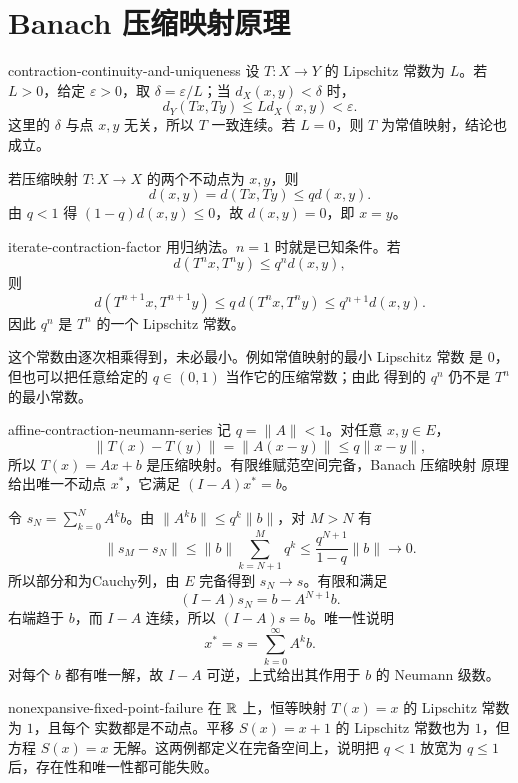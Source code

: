 \chapter{Banach 压缩映射原理}
\label{chap:banach-contraction-solutions}

\begin{solution}{contraction-continuity-and-uniqueness}
设 \(T:X\to Y\) 的 Lipschitz 常数为 \(L\)。若 \(L>0\)，给定
\(\varepsilon>0\)，取 \(\delta=\varepsilon/L\)；当
\(d_X(x,y)<\delta\) 时，
\[
 d_Y(Tx,Ty)\le Ld_X(x,y)<\varepsilon.
\]
这里的 \(\delta\) 与点 \(x,y\) 无关，所以 \(T\) 一致连续。若
\(L=0\)，则 \(T\) 为常值映射，结论也成立。

若压缩映射 \(T:X\to X\) 的两个不动点为 \(x,y\)，则
\[
 d(x,y)=d(Tx,Ty)\le qd(x,y).
\]
由 \(q<1\) 得 \((1-q)d(x,y)\le0\)，故 \(d(x,y)=0\)，即 \(x=y\)。
\end{solution}

\begin{solution}{iterate-contraction-factor}
用归纳法。\(n=1\) 时就是已知条件。若
\[
 d(T^nx,T^ny)\le q^n d(x,y),
\]
则
\[
 d(T^{n+1}x,T^{n+1}y)
 \le q\,d(T^nx,T^ny)
 \le q^{n+1}d(x,y).
\]
因此 \(q^n\) 是 \(T^n\) 的一个 Lipschitz 常数。

这个常数由逐次相乘得到，未必最小。例如常值映射的最小 Lipschitz 常数
是 \(0\)，但也可以把任意给定的 \(q\in(0,1)\) 当作它的压缩常数；由此
得到的 \(q^n\) 仍不是 \(T^n\) 的最小常数。
\end{solution}

\begin{solution}{affine-contraction-neumann-series}
记 \(q=\|A\|<1\)。对任意 \(x,y\in E\)，
\[
 \|T(x)-T(y)\|=\|A(x-y)\|\le q\|x-y\|,
\]
所以 \(T(x)=Ax+b\) 是压缩映射。有限维赋范空间完备，Banach 压缩映射
原理给出唯一不动点 \(x^\ast\)，它满足
\((I-A)x^\ast=b\)。

令 \(s_N=\sum_{k=0}^{N}A^kb\)。由
\(\|A^kb\|\le q^k\|b\|\)，对 \(M>N\) 有
\[
 \|s_M-s_N\|\le\|b\|\sum_{k=N+1}^{M}q^k
 \le\frac{q^{N+1}}{1-q}\|b\|\longrightarrow0.
\]
所以部分和为Cauchy列，由 \(E\) 完备得到 \(s_N\to s\)。有限和满足
\[
 (I-A)s_N=b-A^{N+1}b.
\]
右端趋于 \(b\)，而 \(I-A\) 连续，所以 \((I-A)s=b\)。唯一性说明
\[
 x^\ast=s=\sum_{k=0}^{\infty}A^kb.
\]
对每个 \(b\) 都有唯一解，故 \(I-A\) 可逆，上式给出其作用于 \(b\)
的 Neumann 级数。
\end{solution}

\begin{solution}{nonexpansive-fixed-point-failure}
在 \(\mathbb{R}\) 上，恒等映射 \(T(x)=x\) 的 Lipschitz 常数为 \(1\)，且每个
实数都是不动点。平移 \(S(x)=x+1\) 的 Lipschitz 常数也为 \(1\)，但
方程 \(S(x)=x\) 无解。这两例都定义在完备空间上，说明把 \(q<1\)
放宽为 \(q\le1\) 后，存在性和唯一性都可能失败。
\end{solution}

